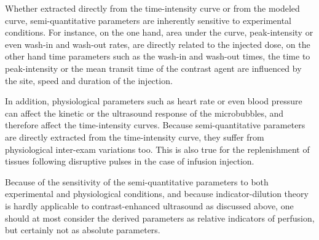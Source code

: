 Whether extracted directly from the time-intensity curve or from the modeled curve, semi-quantitative parameters are inherently sensitive to experimental conditions.
For instance, on the one hand, area under the curve, peak-intensity or even wash-in and wash-out rates, are directly related to the injected dose, on the other hand time parameters such as the wash-in and wash-out times, the time to peak-intensity or the mean transit time of the contrast agent are influenced by the site, speed and duration of the injection.

In addition, physiological parameters such as heart rate or even blood pressure can affect the kinetic or the ultrasound response of the microbubbles, and therefore affect the time-intensity curves. 
Because semi-quantitative parameters are directly extracted from the time-intensity curve, they suffer from physiological inter-exam variations too. 
This is also true for the replenishment of tissues following disruptive pulses in the case of infusion injection.

Because of the sensitivity of the semi-quantitative parameters to both experimental and physiological conditions, and because indicator-dilution theory is hardly applicable to contrast-enhanced ultrasound as discussed above, one should at most consider the derived parameters as relative indicators of perfusion, but certainly not as absolute parameters.



